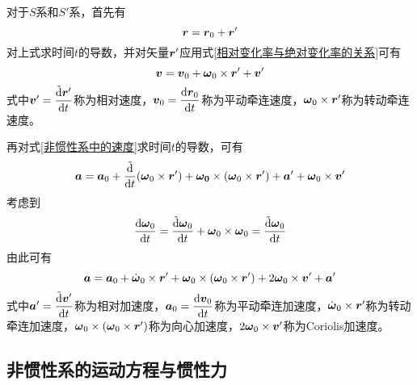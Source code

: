 对于$S$系和$S'$系，首先有
\begin{equation*}
	\boldsymbol{r} = \boldsymbol{r}_0 + \boldsymbol{r}'
\end{equation*}
对上式求时间$t$的导数，并对矢量$\boldsymbol{r}'$应用式\eqref{相对变化率与绝对变化率的关系}可有
\begin{equation}
	\boldsymbol{v} = \boldsymbol{v}_0 + \boldsymbol{\omega}_0 \times \boldsymbol{r}' + \boldsymbol{v}'
	\label{非惯性系中的速度}
\end{equation}
式中$\boldsymbol{v}' = \dfrac{\tilde{\mathrm{d}} \boldsymbol{r}'}{\mathrm{d} t}$称为{\heiti 相对速度}，$\boldsymbol{v}_0 = \dfrac{\mathrm{d} \boldsymbol{r}_0}{\mathrm{d} t}$称为{\heiti 平动牵连速度}，$\boldsymbol{\omega}_0 \times \boldsymbol{r}'$称为{\heiti 转动牵连速度}。

再对式\eqref{非惯性系中的速度}求时间$t$的导数，可有
\begin{align*}
	\boldsymbol{a} = \boldsymbol{a}_0 + \frac{\tilde{\mathrm{d}}}{\mathrm{d} t} (\boldsymbol{\omega}_0 \times \boldsymbol{r}') + \boldsymbol{\omega_0} \times (\boldsymbol{\omega}_0 \times \boldsymbol{r}') + \boldsymbol{a}' + \boldsymbol{\omega}_0 \times \boldsymbol{v}'
\end{align*}
考虑到
\begin{equation*}
	\frac{\mathrm{d} \boldsymbol{\omega}_0}{\mathrm{d} t} = \frac{\tilde{\mathrm{d}} \boldsymbol{\omega}_0}{\mathrm{d} t} + \boldsymbol{\omega}_0 \times \boldsymbol{\omega}_0 = \frac{\tilde{\mathrm{d}} \boldsymbol{\omega}_0}{\mathrm{d} t}
\end{equation*}
由此可有
\begin{equation}
	\boldsymbol{a} = \boldsymbol{a}_0 + \dot{\boldsymbol{\omega}}_0 \times \boldsymbol{r}' + \boldsymbol{\omega}_0 \times (\boldsymbol{\omega}_0 \times \boldsymbol{r}') + 2\boldsymbol{\omega}_0 \times \boldsymbol{v}' + \boldsymbol{a}'
\end{equation}
式中$\boldsymbol{a}' = \dfrac{\tilde{\mathrm{d}} \boldsymbol{v}'}{\mathrm{d} t}$称为{\heiti 相对加速度}，$\boldsymbol{a}_0 = \dfrac{\mathrm{d} \boldsymbol{v}_0}{\mathrm{d} t}$称为{\heiti 平动牵连加速度}，$\dot{\boldsymbol{\omega}}_0 \times \boldsymbol{r}'$称为{\heiti 转动牵连加速度}，$\boldsymbol{\omega}_0 \times (\boldsymbol{\omega}_0 \times \boldsymbol{r}')$称为{\heiti 向心加速度}，$2\boldsymbol{\omega}_0 \times \boldsymbol{v}'$称为{\heiti Coriolis加速度}。

\subsection{非惯性系的运动方程与惯性力}\label{chapter7:subsection-非惯性系的运动方程与惯性力}

